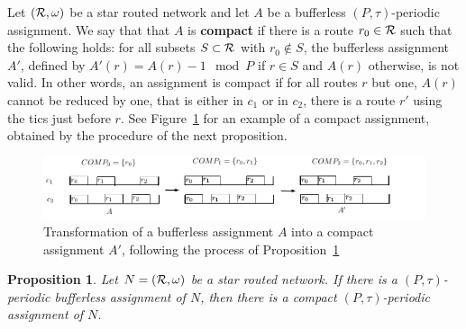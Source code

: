 \documentclass[a4paper,10pt]{journal}
\newtheorem{proposition}{Proposition}
\begin{document}
Let $({\cal R},\omega)$ be a star routed network and let $A$ be a bufferless $(P,\tau)$-periodic assignment.
We say that that $A$ is \textbf{compact} if there is a route $r_0 \in \cal{R}$ such that the following holds: for all subsets $S\subset \cal{R}$ with $r_0 \notin S$, the bufferless assignment $A'$, defined by $A'(r) = A(r) - 1 \mod P$ if $r \in S$ and $A(r)$ otherwise, is not valid. In other words, an assignment is compact if for all routes $r$ but one, $A(r)$ cannot be reduced by one, that is either in $c_1$ or in $c_2$, there is a route $r'$ using the tics just before $r$. See Figure~\ref{fig:compact} for an example of a compact assignment, obtained by the procedure of the next proposition. 
  \begin{figure}
      \begin{center} 
      \includegraphics[width=\textwidth]{compacttoassignment.pdf}
      \end{center}
      \caption{Transformation of a bufferless assignment $A$ into a compact assignment $A'$, following the process of Proposition~\ref{prop:compactification}}
      \label{fig:compact}
      \end{figure}
\begin{proposition}\label{prop:compactification}
Let $N = ({\cal R}, \omega)$ be a star routed network. If there is a $(P,\tau)$-periodic bufferless assignment of $N$, then there is a compact $(P,\tau)$-periodic assignment of $N$.
\end{proposition}
\end{document}
